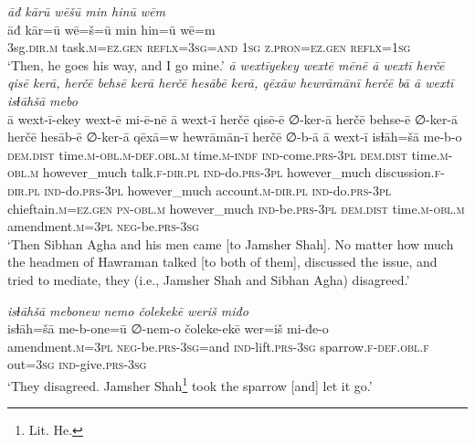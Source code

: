 \ea \label{DP.45}
\textit{āđ kārū wēšū min hinū wēm} \\ 
\gll āđ kār=ū wē=š=ū min hin=ū wē=m \\ 
 3sg\textsc{.dir}\textsc{.m} task\textsc{.m}\textsc{=ez}\textsc{.gen} \textsc{reflx}\textsc{=3sg}\textsc{=and} \textsc{1sg} \textsc{z.pron}\textsc{=ez}\textsc{.gen} \textsc{reflx}\textsc{=1sg} \\ 
\glt `Then, he goes his way, and I go mine.'
\z 
\ea \label{DP.46}
\textit{ā wextīyekey wextē mēnē ā wextī herčē qisē kerā, herčē behsē kerā herčē hesābē kerā, qēxāw hewrāmānī herčē bā ā wextī isɫāhšā mebo} \\ 
\gll ā wext-ī-ekey wext-ē mi-ē-nē ā wext-ī herčē qisē-ē ∅-ker-ā herčē behse-ē ∅-ker-ā herčē hesāb-ē ∅-ker-ā qēxā=w hewrāmān-ī herčē ∅-b-ā ā wext-ī isɫāh=šā me-b-o \\ 
 \textsc{dem.dist} time\textsc{.m}\textsc{-obl}\textsc{.m}\textsc{-def}\textsc{.obl}\textsc{.m} time\textsc{.m}\textsc{-indf} \textsc{ind-}come\textsc{.prs}\textsc{-3pl} \textsc{dem.dist} time\textsc{.m}\textsc{-obl}\textsc{.m} however\_much talk\textsc{\textsc{.f}}\textsc{-dir}\textsc{.pl} \textsc{ind-}do\textsc{.prs}\textsc{-3pl} however\_much discussion\textsc{\textsc{.f}}\textsc{-dir}\textsc{.pl} \textsc{ind-}do\textsc{.prs}\textsc{-3pl} however\_much account\textsc{.m}\textsc{-dir}\textsc{.pl} \textsc{ind-}do\textsc{.prs}\textsc{-3pl} chieftain\textsc{.m}\textsc{=ez}\textsc{.gen} \textsc{pn}\textsc{-obl}\textsc{.m} however\_much \textsc{ind-}be\textsc{.prs}\textsc{-3pl} \textsc{dem.dist} time\textsc{.m}\textsc{-obl}\textsc{.m} amendment\textsc{.m}\textsc{=3pl} \textsc{neg-}be\textsc{.prs}\textsc{-3sg} \\ 
\glt `Then Sibhan Agha and his men came [to Jamsher Shah]. No matter how much the headmen of Hawraman talked [to both of them], discussed the issue, and tried to mediate, they (i.e., Jamsher Shah and Sibhan Agha) disagreed.'
\z 
 
\ea \label{DP.47}
\textit{isɫāhšā mebonew nemo čolekekē weriš miđo} \\ 
\gll isɫāh=šā me-b-one=ū ∅-nem-o čoleke-ekē wer=iš mi-đe-o \\ 
 amendment\textsc{.m}\textsc{=3pl} \textsc{neg-}be\textsc{.prs}\textsc{-3sg}=and \textsc{ind-}lift\textsc{.prs}\textsc{-3sg} sparrow\textsc{\textsc{.f}}\textsc{-def}\textsc{.obl}\textsc{\textsc{.f}} out\textsc{=3sg} \textsc{ind-}give\textsc{.prs}\textsc{-3sg} \\ 
\glt `They disagreed. Jamsher Shah\footnote{Lit. He.} took the sparrow [and] let it go.'
\z 
 
